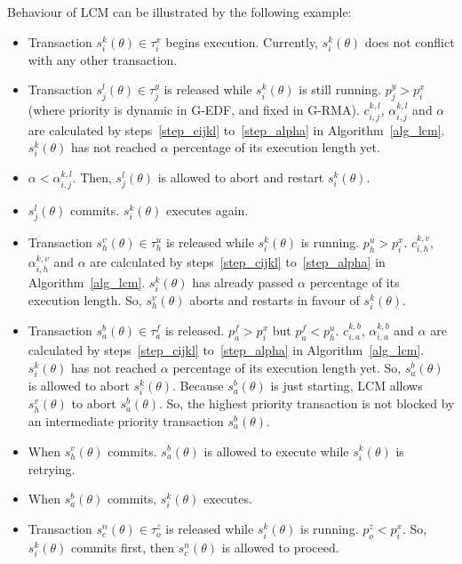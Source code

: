\documentclass[12pt,english]{report}
\begin{document}
Behaviour of LCM can be illustrated by the following example:
\begin{itemize}
\item Transaction $s_{i}^{k}(\theta)\in\tau_{i}^{x}$ begins execution.
Currently, $s_{i}^{k}(\theta)$ does not conflict with any other transaction.
\item Transaction $s_{j}^{l}(\theta)\in\tau_{j}^{y}$ is released while
$s_{i}^{k}(\theta)$ is still running. $p_{j}^{y}>p_{i}^{x}$ (where
priority is dynamic in G-EDF, and fixed in G-RMA). $c_{i,j}^{k,l}$,
$\alpha_{i,j}^{k,l}$ and $\alpha$ are calculated by steps~\ref{step_cijkl} to~\ref{step_alpha} 
in Algorithm~\ref{alg_lcm}. $s_{i}^{k}(\theta)$ has not reached $\alpha$
percentage of its execution length yet. 
\item $\alpha<\alpha_{i,j}^{k,l}$. Then, $s_{j}^{l}(\theta)$ is allowed
to abort and restart $s_{i}^{k}(\theta)$.
\item $s_{j}^{l}(\theta)$ commits. $s_{i}^{k}(\theta)$ executes again.
\item Transaction $s_{h}^{v}(\theta)\in\tau_{h}^{u}$ is released while
$s_{i}^{k}(\theta)$ is running. $p_{h}^{u}>p_{i}^{x}$. $c_{i,h}^{k,v}$,
$\alpha_{i,h}^{k,v}$ and $\alpha$ are calculated by steps~\ref{step_cijkl} to~\ref{step_alpha}
in Algorithm~\ref{alg_lcm}. $s_{i}^{k}(\theta)$ has already passed $\alpha$
percentage of its execution length. So, $s_{h}^{v}(\theta)$ aborts
and restarts in favour of $s_{i}^{k}(\theta)$.
\item Transaction $s_{a}^{b}(\theta)\in\tau_{a}^{f}$ is released. $p_{a}^{f}>p_{i}^{x}$
but $p_{a}^{f}<p_{h}^{u}$. $c_{i,a}^{k,b}$, $\alpha_{i,a}^{k,b}$
and $\alpha$ are calculated by steps~\ref{step_cijkl} to~\ref{step_alpha} in Algorithm~\ref{alg_lcm}.
$s_{i}^{k}(\theta)$ has not reached $\alpha$ percentage of its execution
length yet. So, $s_{a}^{b}(\theta)$ is allowed to abort $s_{i}^{k}(\theta)$.
Because $s_{a}^{b}(\theta)$ is just starting, LCM allows $s_{h}^{v}(\theta)$
to abort $s_{a}^{b}(\theta)$. So, the highest priority transaction
is not blocked by an intermediate priority transaction $s_{a}^{b}(\theta)$.
\item When $s_{h}^{v}(\theta)$ commits. $s_{a}^{b}(\theta)$ is allowed
to execute while $s_{i}^{k}(\theta)$ is retrying.
\item When $s_{a}^{b}(\theta)$ commits, $s_{i}^{k}(\theta)$ executes.
\item Transaction $s_{c}^{n}(\theta)\in\tau_{o}^{z}$ is released while
$s_{i}^{k}(\theta)$ is running. $p_{o}^{z}<p_{i}^{x}$. So, $s_{i}^{k}(\theta)$
commits first, then $s_{c}^{n}(\theta)$ is allowed to proceed.
\end{itemize} 
\end{document}
